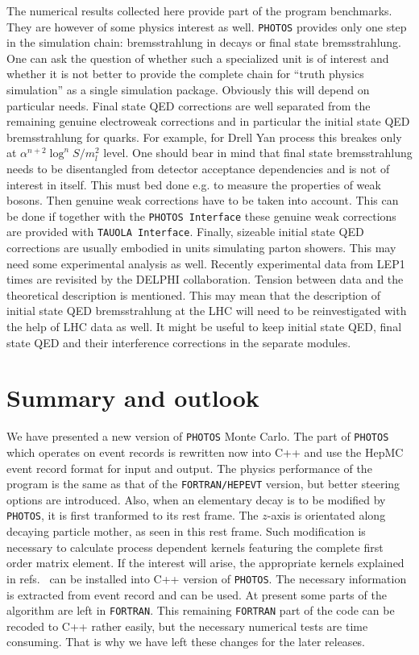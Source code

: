\documentclass[]{Photos_interface_design}
\begin{document}
The numerical results collected here provide part of the program benchmarks. 
They are however of  some physics interest as well.
 {\tt PHOTOS} provides only one step in the simulation chain: 
bremsstrahlung in decays or final state bremsstrahlung. One can ask 
the question of whether such a specialized unit is of interest and whether it is not better 
to provide the complete chain for ``truth physics simulation'' as a single simulation package. Obviously this will
depend on particular needs. Final state QED corrections are 
well separated from the remaining genuine electroweak corrections and 
in particular the initial state QED bremsstrahlung for quarks. For example, for
Drell Yan process this breakes only at $\alpha^{n+2}\log^{n}{S/m_l^{2}}$ level.
One should bear in mind that final state bremsstrahlung 
needs to be disentangled from detector acceptance dependencies and is not of 
interest in itself. This must bed done e.g. to measure the properties of weak bosons.
Then genuine weak corrections have to be taken into account.
This can be done if together with the {\tt PHOTOS Interface}
these genuine weak corrections are provided with {\tt TAUOLA Interface}.
Finally, sizeable initial state QED corrections are usually embodied in  units 
simulating parton showers. This may need some experimental analysis as well. 
Recently experimental data from LEP1 times are revisited \cite{Abdallah:2010tk} 
by the DELPHI collaboration. Tension between data and the theoretical description is 
mentioned. This may mean that the description of initial state QED bremsstrahlung 
at the LHC will need to be reinvestigated with the help of LHC data as well.
It might be useful to keep initial state QED, final state QED and their interference corrections in the separate modules.

\section{Summary and outlook}
\label{sec:summary}
We have presented a new version  of {\tt PHOTOS} Monte Carlo. The part of 
{\tt PHOTOS} which operates on 
event records is rewritten now into C++ and use the HepMC event record 
format for input and output. The physics performance of the program is the
same as that of 
the {\tt FORTRAN/HEPEVT} version, but better steering options are introduced. 
Also, when an elementary decay is to be modified by {\tt PHOTOS}, 
it is first tranformed to its rest frame. The $z$-axis is orientated along decaying particle mother, as seen in this rest  frame. Such modification is 
necessary to calculate process dependent kernels
featuring the complete first order matrix element. If the interest will arise,
the appropriate kernels explained in
refs.~\cite{Golonka:2006tw,Nanava:2006vv,Nanava:2009vg} can be installed
into  C++ version of {\tt PHOTOS}. The necessary information is extracted
from event record and can be used.
At present some parts of the algorithm are left in {\tt FORTRAN}.
 This remaining {\tt FORTRAN} part of the code 
can be recoded to C++ rather easily, but the necessary numerical tests 
are time consuming. That is why we have left these changes for the later 
releases. 
\end{document}

